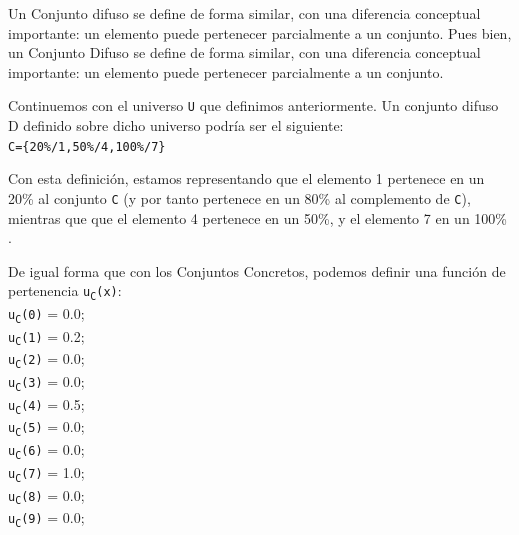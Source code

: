 Un Conjunto difuso se define de forma similar, con una diferencia conceptual importante: un elemento puede pertenecer parcialmente a un conjunto.
Pues bien, un Conjunto Difuso se define de forma similar, con una
diferencia conceptual importante: un elemento puede pertenecer
parcialmente a un conjunto. 

Continuemos con el universo \texttt{U} que definimos anteriormente.
Un conjunto difuso D definido sobre dicho universo podría ser el siguiente:
\\ \newline
\null\hspace{0.59cm}\texttt{C=\{20\%/1,50\%/4,100\%/7\}}

Con esta definición, estamos representando que el elemento 1 pertenece en un 20\% al
conjunto \texttt{C} (y por tanto pertenece en un 80\% al complemento de \texttt{C}), mientras que
que el elemento 4 pertenece en un 50\%, y el elemento 7 en un 100\% .

De igual forma que con los Conjuntos Concretos, podemos definir una función de pertenencia \texttt{u\textsubscript{C}(x)}:
\\ \newline
\null\hspace{0.59cm}\texttt{u\textsubscript{C}(0)} = 0.0;\\
\null\hspace{0.59cm}\texttt{u\textsubscript{C}(1)} = 0.2;\\
\null\hspace{0.59cm}\texttt{u\textsubscript{C}(2)} = 0.0;\\
\null\hspace{0.59cm}\texttt{u\textsubscript{C}(3)} = 0.0;\\
\null\hspace{0.59cm}\texttt{u\textsubscript{C}(4)} = 0.5;\\
\null\hspace{0.59cm}\texttt{u\textsubscript{C}(5)} = 0.0;\\
\null\hspace{0.59cm}\texttt{u\textsubscript{C}(6)} = 0.0;\\
\null\hspace{0.59cm}\texttt{u\textsubscript{C}(7)} = 1.0;\\
\null\hspace{0.59cm}\texttt{u\textsubscript{C}(8)} = 0.0;\\
\null\hspace{0.59cm}\texttt{u\textsubscript{C}(9)} = 0.0;

